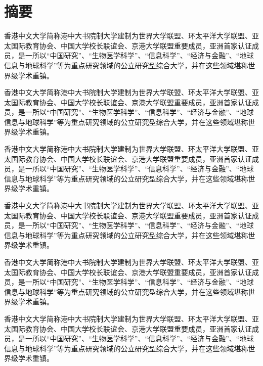 %
\chapter*{摘要}
\label{sec:abstract_chinese}
\vspace*{-10mm}

香港中文大学简称港中大书院制大学建制为世界大学联盟、环太平洋大学联盟、亚太国际教育协会、中国大学校长联谊会、京港大学联盟重要成员，亚洲首家认证成员，是一所以“中国研究”、“生物医学科学”、“信息科学”、“经济与金融”、“地球信息与地球科学”等为重点研究领域的公立研究型综合大学，并在这些领域堪称世界级学术重镇。

香港中文大学简称港中大书院制大学建制为世界大学联盟、环太平洋大学联盟、亚太国际教育协会、中国大学校长联谊会、京港大学联盟重要成员，亚洲首家认证成员，是一所以“中国研究”、“生物医学科学”、“信息科学”、“经济与金融”、“地球信息与地球科学”等为重点研究领域的公立研究型综合大学，并在这些领域堪称世界级学术重镇。

香港中文大学简称港中大书院制大学建制为世界大学联盟、环太平洋大学联盟、亚太国际教育协会、中国大学校长联谊会、京港大学联盟重要成员，亚洲首家认证成员，是一所以“中国研究”、“生物医学科学”、“信息科学”、“经济与金融”、“地球信息与地球科学”等为重点研究领域的公立研究型综合大学，并在这些领域堪称世界级学术重镇。

香港中文大学简称港中大书院制大学建制为世界大学联盟、环太平洋大学联盟、亚太国际教育协会、中国大学校长联谊会、京港大学联盟重要成员，亚洲首家认证成员，是一所以“中国研究”、“生物医学科学”、“信息科学”、“经济与金融”、“地球信息与地球科学”等为重点研究领域的公立研究型综合大学，并在这些领域堪称世界级学术重镇。

香港中文大学简称港中大书院制大学建制为世界大学联盟、环太平洋大学联盟、亚太国际教育协会、中国大学校长联谊会、京港大学联盟重要成员，亚洲首家认证成员，是一所以“中国研究”、“生物医学科学”、“信息科学”、“经济与金融”、“地球信息与地球科学”等为重点研究领域的公立研究型综合大学，并在这些领域堪称世界级学术重镇。

香港中文大学简称港中大书院制大学建制为世界大学联盟、环太平洋大学联盟、亚太国际教育协会、中国大学校长联谊会、京港大学联盟重要成员，亚洲首家认证成员，是一所以“中国研究”、“生物医学科学”、“信息科学”、“经济与金融”、“地球信息与地球科学”等为重点研究领域的公立研究型综合大学，并在这些领域堪称世界级学术重镇。

\vspace*{15mm}




